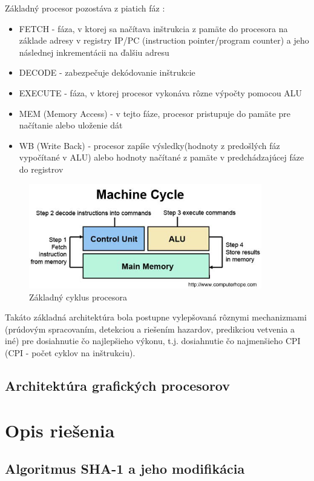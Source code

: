 \documentclass[conference]{IEEEtran}
\begin{document}
Základný procesor pozostáva z piatich fáz \cite{hennessy2007compute}: 

\begin{itemize}
	\item{FETCH - fáza, v ktorej sa načítava inštrukcia z pamäte do procesora na základe adresy v registry IP/PC (instruction pointer/program counter) a jeho následnej inkrementácii na ďalšiu adresu }
	\item{DECODE - zabezpečuje dekódovanie inštrukcie}
	\item{EXECUTE - fáza, v ktorej procesor vykonáva rôzne výpočty pomocou ALU}
	\item{MEM (Memory Access) - v tejto fáze, procesor pristupuje do pamäte pre načítanie alebo uloženie dát}
	\item{WB (Write Back) - procesor zapíše výsledky(hodnoty z predošlých fáz vypočítané v ALU) alebo hodnoty načítané z pamäte v predchádzajúcej fáze do registrov}
\end{itemize}

\begin{figure}[!h]
\centering
\includegraphics[width=4in]{img/CPU-cycle}
\caption{Základný cyklus procesora}
\end{figure}

Takáto základná architektúra bola postupne vylepšovaná rôznymi mechanizmami (prúdovým spracovaním, detekciou a riešením hazardov, predikciou vetvenia a iné) pre dosiahnutie čo najlepšieho výkonu, t.j. dosiahnutie čo najmenšieho CPI (CPI - počet cyklov na inštrukciu).




\subsection{Architektúra grafických procesorov}

\section{Opis riešenia}

\subsection{Algoritmus SHA-1 a jeho modifikácia}
\end{document}
